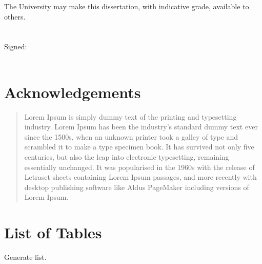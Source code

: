 \documentclass[
a4paper,
11pt,
english
]{report}
\begin{document}

The University may make this dissertation, with indicative grade, available to others.\\ \\ \\



\noindent Signed:\\
\\
\clearpage


\section{Acknowledgements}
\clearpage


\begin{abstract}
Lorem Ipsum is simply dummy text of the printing and typesetting industry. Lorem Ipsum has been the industry's standard dummy text ever since the 1500s, when an unknown printer took a galley of type and scrambled it to make a type specimen book. It has survived not only five centuries, but also the leap into electronic typesetting, remaining essentially unchanged. It was popularised in the 1960s with the release of Letraset sheets containing Lorem Ipsum passages, and more recently with desktop publishing software like Aldus PageMaker including versions of Lorem Ipsum.
\end{abstract}


\tableofcontents
\clearpage


\section{List of Tables}
Generate list.
\clearpage
\end{document}
